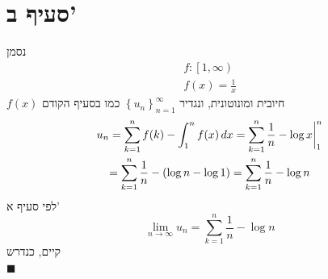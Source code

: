 \documentclass[12pt, titlepage]{article}
\begin{document}
\section*{סעיף ב'}
נסמן
\begin{gather*}
    f: \left[1,\infty\right)\\
    f(x)  =\frac{1}{x}
\end{gather*}
$f(x)$ חיובית ומונוטונית, ונגדיר $\left\{u_n\right\}_{n=1}^{\infty}$ כמו בסעיף הקודם
\begin{gather*}
    u_n = \sum_{k=1}^n f(k) - \int_1^n f(x)\,dx = \sum_{k=1}^n \frac{1}{n} - \log x \bigg{|}^n_1 \\
    =  \sum_{k=1}^n \frac{1}{n} - \left(\log n - \log 1\right) =  \sum_{k=1}^n \frac{1}{n} - \log n
\end{gather*}
לפי סעיף א'
$$
\lim_{n\to\infty} u_n = \sum_{k=1}^n \frac{1}{n} - \log n
$$
קיים, כנדרש\\
$\blacksquare$
\end{document}
